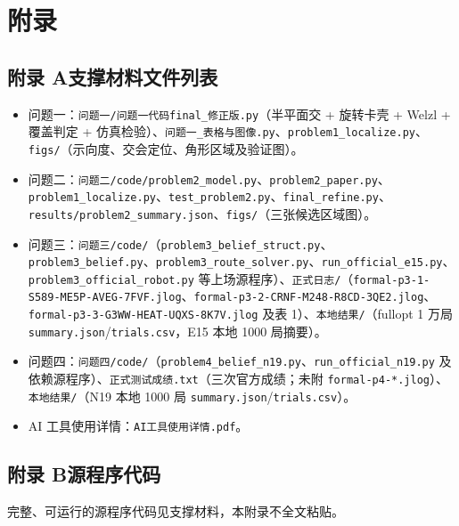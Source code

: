 \documentclass[12pt,a4paper]{article}
\begin{document}
\section*{附录}
\subsection*{附录 A\quad 支撑材料文件列表}
\begin{itemize}
\item 问题一：\texttt{问题一/问题一代码final\_修正版.py}（半平面交 + 旋转卡壳 + Welzl + 覆盖判定 + 仿真检验）、\texttt{问题一\_表格与图像.py}、\texttt{problem1\_localize.py}、\texttt{figs/}（示向度、交会定位、角形区域及验证图）。
\item 问题二：\texttt{问题二/code/problem2\_model.py}、\texttt{problem2\_paper.py}、\texttt{problem1\_localize.py}、\texttt{test\_problem2.py}、\texttt{final\_refine.py}、\texttt{results/problem2\_summary.json}、\texttt{figs/}（三张候选区域图）。
\item 问题三：\texttt{问题三/code/}（\texttt{problem3\_belief\_struct.py}、\texttt{problem3\_belief.py}、\texttt{problem3\_route\_solver.py}、\texttt{run\_official\_e15.py}、\texttt{problem3\_official\_robot.py} 等上场源程序）、\texttt{正式日志/}（\texttt{formal-p3-1-S589-ME5P-AVEG-7FVF.jlog}、\texttt{formal-p3-2-CRNF-M248-R8CD-3QE2.jlog}、\texttt{formal-p3-3-G3WW-HEAT-UQXS-8K7V.jlog} 及表 1）、\texttt{本地结果/}（fullopt 1 万局 \texttt{summary.json}/\texttt{trials.csv}，E15 本地 1000 局摘要）。
\item 问题四：\texttt{问题四/code/}（\texttt{problem4\_belief\_n19.py}、\texttt{run\_official\_n19.py} 及依赖源程序）、\texttt{正式测试成绩.txt}（三次官方成绩；未附 \texttt{formal-p4-*.jlog}）、\texttt{本地结果/}（N19 本地 1000 局 \texttt{summary.json}/\texttt{trials.csv}）。
\item AI 工具使用详情：\texttt{AI工具使用详情.pdf}。
\end{itemize}

\subsection*{附录 B\quad 源程序代码}
完整、可运行的源程序代码见支撑材料，本附录不全文粘贴。
\end{document}
